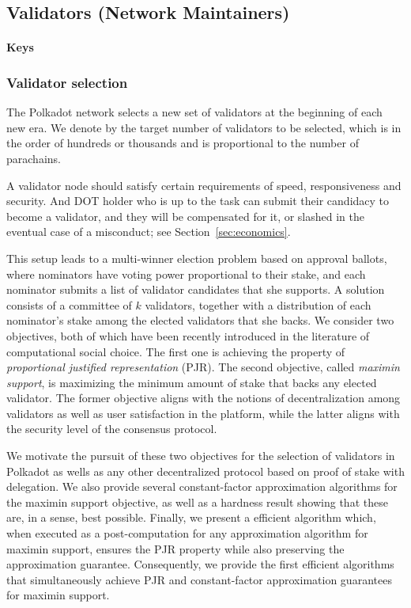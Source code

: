 \subsection{Validators (Network Maintainers)}
 \paragraph{Keys}

 \subsubsection{Validator selection}

 The Polkadot network selects a new set of validators at the beginning of each new era. We denote by \nval the target number of validators to be selected, which is in the order of hundreds or thousands and is proportional to the number of parachains. 

A validator node should satisfy certain requirements of speed, responsiveness and security. And DOT holder who is up to the task can submit their candidacy to become a validator, and they will be compensated for it, or slashed in the eventual case of a misconduct; see Section~\ref{sec:economics}. 

This setup leads to a multi-winner election problem based on approval ballots, where nominators have voting power proportional to their stake, and each nominator submits a list of validator candidates that she supports. A solution consists of a committee of $k$ validators, together with a distribution of each nominator's stake among the elected validators that she backs. We consider two objectives, both of which have been recently introduced in the literature of computational social choice. The first one is achieving the property of \emph{proportional justified representation} (PJR). The second objective, called \emph{maximin support}, is maximizing the minimum amount of stake that backs any elected validator. The former objective aligns with the notions of decentralization among validators as well as user satisfaction in the platform, while the latter aligns with the security level of the consensus protocol. 

We motivate the pursuit of these two objectives for the selection of validators in Polkadot as wells as any other decentralized protocol based on proof of stake with delegation. We also provide several constant-factor approximation algorithms for the maximin support objective, as well as a hardness result showing that these are, in a sense, best possible. Finally, we present a efficient algorithm which, when executed as a post-computation for any approximation algorithm for maximin support, ensures the PJR property while also preserving the approximation guarantee. Consequently, we provide the first efficient algorithms that simultaneously achieve PJR and constant-factor approximation guarantees for maximin support. 